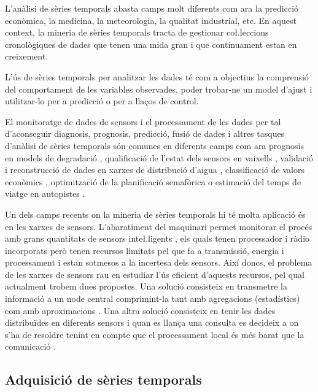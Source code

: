 L'anàlisi de sèries temporals abasta camps molt diferents com ara la predicció econòmica, la medicina, la meteorologia, la qualitat industrial, etc. En aquest context,  la mineria de sèries temporals tracta de gestionar co\l.leccions cronològiques de dades que tenen una mida gran i que contínuament estan en creixement.


L'ús de sèries temporals per analitzar les dades té com a objectius la comprensió del comportament de les variables observades, poder trobar-ne un model d'ajust i utilitzar-lo per a predicció o per a llaços de control.


El monitoratge de dades de sensors i el processament de les dades per tal d'aconseguir diagnosis, prognosis, predicció, fusió de dades i altres tasques d'anàlisi de sèries temporals són comunes en diferents camps com ara prognosis en models de degradació \parencite{yu11}, qualificació de l'estat dels sensors en vaixells \parencite{palmer07}, validació i reconstrucció de dades en xarxes de distribució d'aigua \parencite{quevedo10}, classificació de valors econòmics \parencite{dreyer95}, optimització de la planificació semafòrica \parencite{last11} o estimació del temps de viatge en autopistes \parencite{soriguera10}.



Un dels camps recents on la mineria de sèries temporals hi té molta aplicació és en les xarxes de sensors. L'abaratiment del maquinari permet monitorar el procés amb grans quantitats de sensors inte\l.ligents \parencite{jainagrawal05,yaogehrke02}, els quals tenen processador i ràdio incorporats però tenen recursos limitats pel que fa a transmissió, energia i processament i estan sotmesos a la incertesa dels sensors. Així doncs, el problema  de les xarxes de sensors rau en estudiar l'ús eficient d'aquests recursos, pel qual actualment trobem dues propostes.
Una solució consisteix en transmetre la informació a un node central comprimint-la tant amb agregacions (estadístics) com amb aproximacions \parencite{deligiannakis07}.
Una altra solució consisteix en tenir les dades distribuïdes en diferents sensors i quan es llança una consulta es decideix a on s'ha de resoldre tenint en compte que el processament local és més barat que la comunicació \parencite{yaogehrke02,gehrkemadden04,bonnet01}. 


\subsection{Adquisició de sèries temporals}

